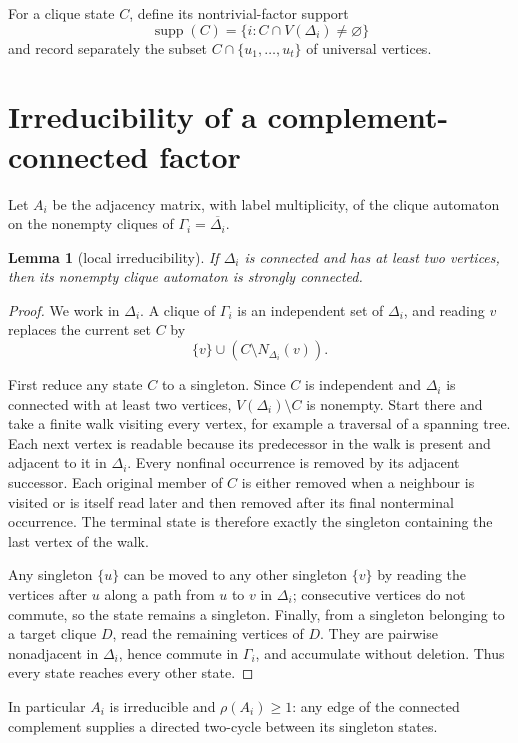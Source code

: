 \documentclass[11pt,a4paper]{amsart}
\newtheorem{lemma}[theorem]{Lemma}
\theoremstyle{definition}
\theoremstyle{remark}
\newcommand{\supp}{\operatorname{supp}}
\begin{document}
For a clique state $C$, define its nontrivial-factor support
\[
 \supp(C)=\{i:C\cap V(\Delta_i)\neq\varnothing\}
\]
and record separately the subset $C\cap\{u_1,\ldots,u_t\}$ of universal
vertices.

\section{Irreducibility of a complement-connected factor}

Let $A_i$ be the adjacency matrix, with label multiplicity, of the clique
automaton on the nonempty cliques of $\Gamma_i=\overline{\Delta_i}$.

\begin{lemma}[local irreducibility]\label{lem:local}
If $\Delta_i$ is connected and has at least two vertices, then its nonempty
clique automaton is strongly connected.
\end{lemma}

\begin{proof}
We work in $\Delta_i$.  A clique of $\Gamma_i$ is an independent set of
$\Delta_i$, and reading $v$ replaces the current set $C$ by
\[
 \{v\}\cup(C\setminus N_{\Delta_i}(v)).
\]

First reduce any state $C$ to a singleton.  Since $C$ is independent and
$\Delta_i$ is connected with at least two vertices, $V(\Delta_i)\setminus C$
is nonempty.  Start there and take a finite walk visiting every vertex, for
example a traversal of a spanning tree.  Each next vertex is readable because
its predecessor in the walk is present and adjacent to it in $\Delta_i$.
Every nonfinal occurrence is removed by its adjacent successor.  Each
original member of $C$ is either removed when a neighbour is visited or is
itself read later and then removed after its final nonterminal occurrence.
The terminal state is therefore exactly the singleton containing the last
vertex of the walk.

Any singleton $\{u\}$ can be moved to any other singleton $\{v\}$ by reading
the vertices after $u$ along a path from $u$ to $v$ in $\Delta_i$; consecutive vertices
do not commute, so the state remains a singleton.  Finally, from a singleton
belonging to a target clique $D$, read the remaining vertices of $D$.  They
are pairwise nonadjacent in $\Delta_i$, hence commute in $\Gamma_i$, and
accumulate without deletion.  Thus every state reaches every other state.
\end{proof}

In particular $A_i$ is irreducible and $\rho(A_i)\geq1$: any edge of the
connected complement supplies a directed two-cycle between its singleton
states.
\end{document}
